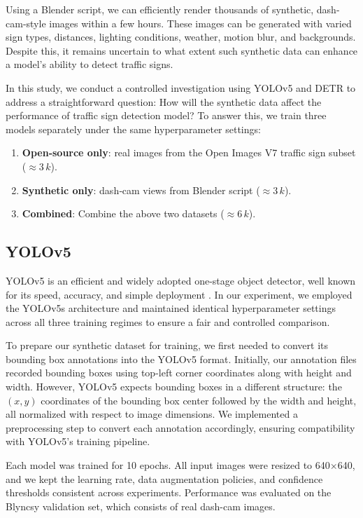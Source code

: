 \documentclass[journal]{IEEEtran}
\begin{document}
Using a Blender script, we can efficiently render thousands of synthetic, dash-cam-style images within a few hours. These images can be generated with varied sign types, distances, lighting conditions, weather, motion blur, and backgrounds. Despite this, it remains uncertain to what extent such synthetic data can enhance a model’s ability to detect traffic signs.

In this study, we conduct a controlled investigation using YOLOv5 and DETR to address a straightforward question: How will the synthetic data affect the performance of traffic sign detection model? To answer this, we train three models separately under the same hyperparameter settings:

\begin{enumerate}
  \item \textbf{Open‑source only}: real images from the Open Images V7 traffic sign subset ($\approx3\,k$).
  \item \textbf{Synthetic only}: dash‑cam views from Blender script ($\approx3\,k$).
  \item \textbf{Combined}: Combine the above two datasets ($\approx6\,k$).
\end{enumerate}

\subsection{YOLOv5}
YOLOv5 is an efficient and widely adopted one-stage object detector, well known for its speed, accuracy, and simple deployment \cite{glenn_jocher_2022_7347926}. In our experiment, we employed the YOLOv5s architecture and maintained identical hyperparameter settings across all three training regimes to ensure a fair and controlled comparison.

To prepare our synthetic dataset for training, we first needed to convert its bounding box annotations into the YOLOv5 format. Initially, our annotation files recorded bounding boxes using top-left corner coordinates along with height and width. However, YOLOv5 expects bounding boxes in a different structure: the $(x, y)$ coordinates of the bounding box center followed by the width and height, all normalized with respect to image dimensions. We implemented a preprocessing step to convert each annotation accordingly, ensuring compatibility with YOLOv5’s training pipeline.

Each model was trained for 10 epochs. All input images were resized to 640×640, and we kept the learning rate, data augmentation policies, and confidence thresholds consistent across experiments. Performance was evaluated on the Blyncsy validation set, which consists of real dash-cam images.
\end{document}
